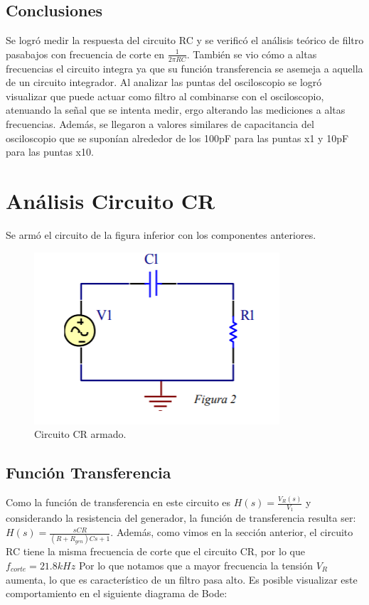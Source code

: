 \subsection{Conclusiones}

Se logró medir la respuesta del circuito RC  y se verificó el análisis teórico de filtro pasabajos con frecuencia de corte en $\frac{1}{2\pi RC}$. También se vio cómo a altas frecuencias el circuito integra ya que su función transferencia se asemeja a aquella de un circuito integrador.
Al analizar las puntas del osciloscopio se logró visualizar que puede actuar como filtro al combinarse con el osciloscopio, atenuando la señal que se intenta medir, ergo alterando las mediciones a altas frecuencias.
Además, se llegaron a valores similares de capacitancia del osciloscopio que se suponían alrededor de los 100pF para las puntas x1 y 10pF para las puntas x10.



\section{Análisis Circuito CR}

Se armó el circuito de la figura inferior con los componentes anteriores.

\begin{figure}[h!]
\centering
\includegraphics[scale=0.5]{crCircuito.png}
\caption{Circuito CR armado.}
\label{fig:CR}
\end{figure}


\subsection{Función Transferencia}

Como la función de transferencia en este circuito es $H(s) = \frac{V_R(s)}{V_1}$ y considerando la resistencia del generador, la función de transferencia resulta ser: $H(s) = \frac{sCR}{\left(R+R_{gen}\right)Cs+1}$. Además, como vimos en la sección anterior, el circuito RC tiene la misma frecuencia de corte que el circuito CR, por lo que $f_{corte}=21.8kHz$
Por lo que notamos que a mayor frecuencia la tensión $V_R$ aumenta, lo que es característico de un filtro pasa alto. Es posible visualizar este comportamiento en el siguiente diagrama de Bode:

